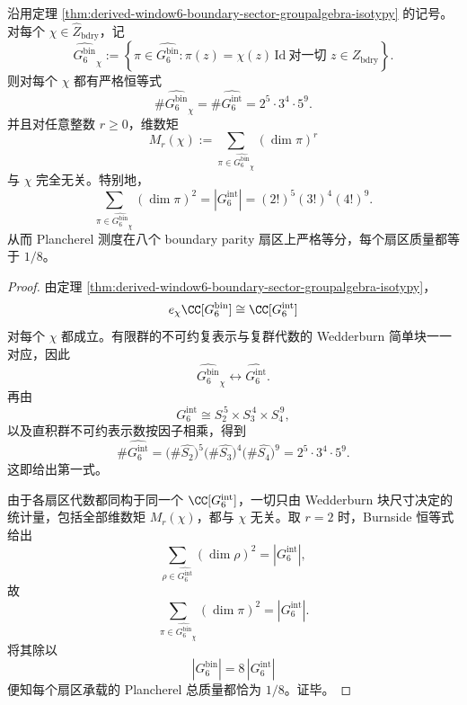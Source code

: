 \begin{theorem}\label{thm:derived-window6-boundary-sector-irrep-moment-uniformity}
沿用定理 \ref{thm:derived-window6-boundary-sector-groupalgebra-isotypy} 的记号。对每个 \(\chi\in\widehat Z_{\mathrm{bdry}}\)，记
\[
\widehat{G_6^{\mathrm{bin}}}_\chi
:=
\left\{
\pi\in\widehat{G_6^{\mathrm{bin}}}:
\pi(z)=\chi(z)\,\mathrm{Id}
\ \text{对一切 } z\in Z_{\mathrm{bdry}}
\right\}.
\]
则对每个 \(\chi\) 都有严格恒等式
\[
\boxed{\;
\#\widehat{G_6^{\mathrm{bin}}}_\chi
=
\#\widehat{G_6^{\mathrm{int}}}
=
2^5\cdot 3^4\cdot 5^9.\;}
\]
并且对任意整数 \(r\ge 0\)，维数矩
\[
M_r(\chi):=
\sum_{\pi\in\widehat{G_6^{\mathrm{bin}}}_\chi}(\dim\pi)^r
\]
与 \(\chi\) 完全无关。特别地，
\[
\boxed{\;
\sum_{\pi\in\widehat{G_6^{\mathrm{bin}}}_\chi}(\dim\pi)^2
=
|G_6^{\mathrm{int}}|
=
(2!)^5(3!)^4(4!)^9.\;}
\]
从而 Plancherel 测度在八个 boundary parity 扇区上严格等分，每个扇区质量都等于 \(1/8\)。
\end{theorem}
\begin{proof}
由定理 \ref{thm:derived-window6-boundary-sector-groupalgebra-isotypy}，
\[
e_\chi\CC[G_6^{\mathrm{bin}}]\cong \CC[G_6^{\mathrm{int}}]
\]
对每个 \(\chi\) 都成立。有限群的不可约复表示与复群代数的 Wedderburn 简单块一一对应，因此
\[
\widehat{G_6^{\mathrm{bin}}}_\chi
\longleftrightarrow
\widehat{G_6^{\mathrm{int}}}.
\]
再由
\[
G_6^{\mathrm{int}}\cong S_2^{\,5}\times S_3^{\,4}\times S_4^{\,9},
\]
以及直积群不可约表示数按因子相乘，得到
\[
\#\widehat{G_6^{\mathrm{int}}}
=
\bigl(\#\widehat{S_2}\bigr)^5
\bigl(\#\widehat{S_3}\bigr)^4
\bigl(\#\widehat{S_4}\bigr)^9
=
2^5\cdot 3^4\cdot 5^9.
\]
这即给出第一式。

由于各扇区代数都同构于同一个 \(\CC[G_6^{\mathrm{int}}]\)，一切只由 Wedderburn 块尺寸决定的统计量，包括全部维数矩 \(M_r(\chi)\)，都与 \(\chi\) 无关。取 \(r=2\) 时，Burnside 恒等式给出
\[
\sum_{\rho\in\widehat{G_6^{\mathrm{int}}}}(\dim\rho)^2
=
|G_6^{\mathrm{int}}|,
\]
故
\[
\sum_{\pi\in\widehat{G_6^{\mathrm{bin}}}_\chi}(\dim\pi)^2
=
|G_6^{\mathrm{int}}|.
\]
将其除以
\[
|G_6^{\mathrm{bin}}|
=
8\,|G_6^{\mathrm{int}}|
\]
便知每个扇区承载的 Plancherel 总质量都恰为 \(1/8\)。证毕。
\end{proof}


